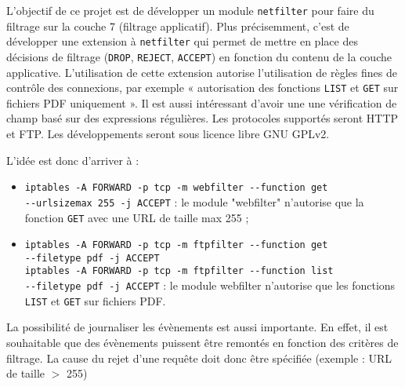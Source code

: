 L'objectif de ce projet est de développer un module \verb+netfilter+ pour faire du filtrage sur la couche 7 (filtrage applicatif). Plus précisemment, c'est de développer une extension à \verb+netfilter+ qui permet de mettre en place des décisions de filtrage (\verb+DROP+, \verb+REJECT+, \verb+ACCEPT+) en fonction du contenu de la couche applicative. L’utilisation de cette extension autorise l'utilisation de règles fines de contrôle des connexions, par exemple « autorisation des fonctions \verb+LIST+ et \verb+GET+ sur fichiers PDF uniquement ». Il est aussi intéressant d'avoir une une vérification de champ basé sur des expressions régulières. Les protocoles supportés seront HTTP et FTP. Les développements seront sous licence libre GNU GPLv2.

L'idée est donc d'arriver à :
\begin{itemize}
\item \verb+iptables -A FORWARD -p tcp -m webfilter --function get+\\ \verb+--urlsizemax 255 -j ACCEPT+ : le module "webfilter" n'autorise que la fonction \verb+GET+ avec une URL de taille max 255 ;
\item \verb+iptables -A FORWARD -p tcp -m ftpfilter --function get+\\
\verb+--filetype pdf -j ACCEPT+\\
\verb+iptables -A FORWARD -p tcp -m ftpfilter --function list+\\
\verb+--filetype pdf -j ACCEPT+ : le module \og webfilter \fg{} n'autorise que les fonctions \verb+LIST+ et \verb+GET+ sur fichiers PDF.
\end{itemize}

La possibilité de journaliser les évènements est aussi importante. En effet, il est souhaitable que des évènements puissent être remontés en fonction des critères de filtrage. La cause du rejet d'une requête doit donc être spécifiée (exemple : URL de taille $>$ 255) 